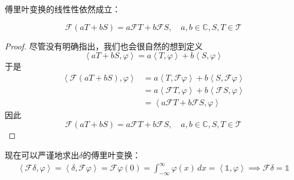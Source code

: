 傅里叶变换的线性性依然成立：
\begin{theorem}[分布的傅里叶变换的线性]
    \[\mathcal{F} (aT+bS)=a\mathcal{F} T+b\mathcal{F} S,\quad a,b\in\mathbb{C},S,T\in\mathcal{T}\]
\end{theorem}
\begin{proof}
    尽管没有明确指出，我们也会很自然的想到定义
\begin{equation}
    \left\langle aT+bS,\varphi\right\rangle=a\left\langle T,\varphi\right\rangle+b\left\langle S,\varphi\right\rangle
\end{equation}
于是\begin{align*}
    \left\langle \mathcal{F} (aT+bS),\varphi\right\rangle & =a\left\langle T,\mathcal{F} \varphi\right\rangle+b\left\langle S,\mathcal{F} \varphi\right\rangle                     \\
                                               & =a\left\langle \mathcal{F} T,\varphi\right\rangle+b\left\langle \mathcal{F} S,\varphi\right\rangle                     \\
                                               & =\left\langle a\mathcal{F} T+b\mathcal{F} S,\varphi\right\rangle
\end{align*}
因此
\[\mathcal{F} (aT+bS)=a\mathcal{F} T+b\mathcal{F} S,\quad a,b\in\mathbb{C},S,T\in\mathcal{T}\]
\end{proof}
\begin{example}
    现在可以严谨地求出$\delta$的傅里叶变换：
\begin{align*}
    \left\langle\mathcal{F}\delta,\varphi\right\rangle=\left\langle \delta,\mathcal{F}\varphi\right\rangle=\mathcal{F}\varphi(0)=\int_{-\infty}^{\infty}\varphi(x)\,dx=\left\langle \mathds{1},\varphi\right\rangle\implies\mathcal{F}\delta=\mathds{1}
\end{align*}
\end{example}

